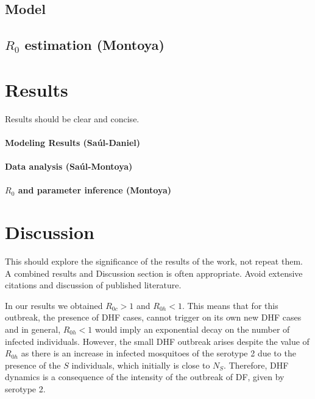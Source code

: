 \documentclass[5p, authoryear, final, sort&compress, times]{elsarticle}
\begin{document}
        \subsection*{Model}
            
            
            
        \subsection{$R_0$ estimation (Montoya)}
    \section{Results}
        Results should be clear and concise.
        \paragraph{Modeling Results (Saúl-Daniel)}
        \paragraph{Data analysis (Saúl-Montoya)}
        \paragraph{$R_0$ and parameter inference (Montoya)}

    \section{Discussion}
        This should explore the significance of the results of 
    the work, not repeat them. A combined results and 
    Discussion section is often appropriate. Avoid extensive 
    citations and discussion of published literature.

        In our results we obtained $R_{0c}>1$ and  $R_{0h}<1$. This means that 
    for this outbreak, the presence of DHF cases, cannot trigger on its own new 
    DHF cases and in general, $R_{0h}<1$ would imply an exponential decay on 
    the number of infected individuals. However, the small DHF outbreak arises 
    despite the value of $R_{0h}$ as there is an increase in infected 
    mosquitoes of the serotype 2 due to the presence of the $S$ individuals, 
    which initially is close to $N_S$. Therefore, DHF dynamics is a consequence 
    of the intensity of the outbreak of DF, given by serotype 2. 
%
\end{document}
